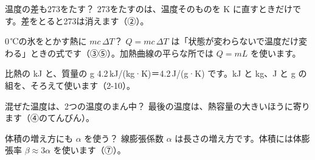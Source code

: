 \begin{tsumazuki}{温度の差も273をたす？}
273をたすのは、温度そのものを K に直すときだけです。差をとると273は消えます（②）。
\end{tsumazuki}

\begin{tsumazuki}{0\,℃の氷をとかす熱に $mc\,\Delta T$？}
$Q=mc\,\Delta T$ は「状態が変わらないで温度だけ変わる」ときの式です（③⑤）。加熱曲線の平らな所では $Q=mL$ を使います。
\end{tsumazuki}

\begin{tsumazuki}{比熱の kJ と、質量の g}
4.2\,kJ/(kg·K)＝4.2\,J/(g·K) です。kJ と kg、J と g の組を、そろえて使います（2-10）。
\end{tsumazuki}

\begin{tsumazuki}{混ぜた温度は、2つの温度のまん中？}
最後の温度は、熱容量の大きいほうに寄ります（④のてんびん）。
\end{tsumazuki}

\begin{tsumazuki}{体積の増え方にも $\alpha$ を使う？}
線膨張係数 $\alpha$ は長さの増え方です。体積には体膨張率 $\beta\approx3\alpha$ を使います（⑦）。
\end{tsumazuki}

